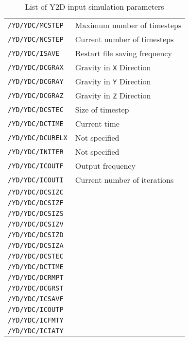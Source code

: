 \appendix

\setcounter{table}{0}
\renewcommand{\thetable}{\Alph{table}}

\begin{table}
    \begin{tabularx}{\columnwidth}{ll}
    \\\midrule
    \texttt{/YD/YDC/MCSTEP} & Maximum number of timesteps       \\
    \texttt{/YD/YDC/NCSTEP} & Current number of timesteps       \\
    \texttt{/YD/YDC/ISAVE}  & Restart file saving frequency     \\
    \texttt{/YD/YDC/DCGRAX} & Gravity in \texttt{X} Direction   \\
    \texttt{/YD/YDC/DCGRAY} & Gravity in \texttt{Y} Direction   \\
    \texttt{/YD/YDC/DCGRAZ} & Gravity in \texttt{Z} Direction   \\
    \texttt{/YD/YDC/DCSTEC} & Size of timestep                  \\
    \texttt{/YD/YDC/DCTIME} & Current time                      \\
    \texttt{/YD/YDC/DCURELX}& Not specified                     \\
    \texttt{/YD/YDC/INITER} & Not specified                     \\
    \texttt{/YD/YDC/ICOUTF} & Output frequency                  \\
    \texttt{/YD/YDC/ICOUTI} & Current number of iterations      \\
    \texttt{/YD/YDC/DCSIZC} &                                   \\
    \texttt{/YD/YDC/DCSIZF} &                                   \\
    \texttt{/YD/YDC/DCSIZS} &                                   \\
    \texttt{/YD/YDC/DCSIZV} &                                   \\
    \texttt{/YD/YDC/DCSIZD} &                                   \\
    \texttt{/YD/YDC/DCSIZA} &                                   \\
    \texttt{/YD/YDC/DCSTEC} &                                   \\
    \texttt{/YD/YDC/DCTIME} &                                   \\
    \texttt{/YD/YDC/DCRMPT} &                                   \\
    \texttt{/YD/YDC/DCGRST} &                                   \\
    \texttt{/YD/YDC/ICSAVF} &                                   \\
    \texttt{/YD/YDC/ICOUTP} &                                   \\
    \texttt{/YD/YDC/ICFMTY} &                                   \\
    \texttt{/YD/YDC/ICIATY} &                                   \\\bottomrule
  \end{tabularx}
  \caption{List of Y2D input simulation parameters}
  \label{tab:inpar}
\end{table}